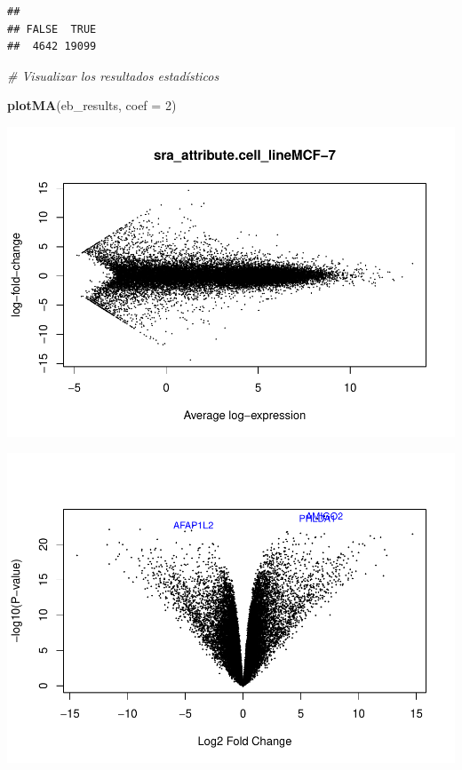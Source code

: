 \documentclass[
]{article}
\newenvironment{Shaded}{\begin{snugshade}}{\end{snugshade}}
\newcommand{\AttributeTok}[1]{\textcolor[rgb]{0.13,0.29,0.53}{#1}}
\newcommand{\CommentTok}[1]{\textcolor[rgb]{0.56,0.35,0.01}{\textit{#1}}}
\newcommand{\DecValTok}[1]{\textcolor[rgb]{0.00,0.00,0.81}{#1}}
\newcommand{\FunctionTok}[1]{\textcolor[rgb]{0.13,0.29,0.53}{\textbf{#1}}}
\newcommand{\NormalTok}[1]{#1}
\newcommand{\SpecialCharTok}[1]{\textcolor[rgb]{0.81,0.36,0.00}{\textbf{#1}}}
\begin{document}
\begin{verbatim}
## 
## FALSE  TRUE 
##  4642 19099
\end{verbatim}

\begin{Shaded}
\begin{Highlighting}[]
\CommentTok{\# Visualizar los resultados estadísticos}

\FunctionTok{plotMA}\NormalTok{(eb\_results, }\AttributeTok{coef =} \DecValTok{2}\NormalTok{)}
\end{Highlighting}
\end{Shaded}

\includegraphics{Proyecto_RNAseq_files/figure-latex/unnamed-chunk-13-1.pdf}

\begin{Shaded}
\end{Shaded}

\includegraphics{Proyecto_RNAseq_files/figure-latex/unnamed-chunk-13-2.pdf}
\end{document}
